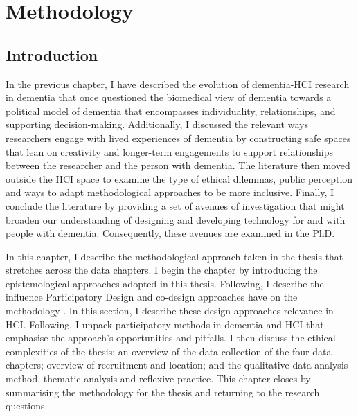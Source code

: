 \chapter{Methodology}
\label{Methodology}

\section{Introduction}
\label{Method:Intro}

In the previous chapter, I have described the evolution of dementia-HCI research in dementia that once questioned the biomedical view of dementia towards a political model of dementia that encompasses individuality, relationships, and supporting decision-making. Additionally, I discussed the relevant ways researchers engage with lived experiences of dementia by constructing safe spaces that lean on creativity and longer-term engagements to support relationships between the researcher and the person with dementia. The literature then moved outside the HCI space to examine the type of ethical dilemmas, public perception and ways to adapt methodological approaches to be more inclusive. Finally, I conclude the literature by providing a set of avenues of investigation that might broaden our understanding of designing and developing technology for and with people with dementia. Consequently, these avenues are examined in the PhD.

In this chapter, I describe the methodological approach taken in the thesis that stretches across the data chapters. I begin the chapter by introducing the epistemological approaches adopted in this thesis. Following, I describe the influence Participatory Design and co-design approaches have on the methodology \citep{duarte2018participatory}. In this section, I describe these design approaches relevance in HCI. Following, I unpack participatory methods in dementia and HCI that emphasise the approach's opportunities and pitfalls. I then discuss the ethical complexities of the thesis; an overview of the data collection of the four data chapters; overview of recruitment and location; and the qualitative data analysis method, thematic analysis and reflexive practice. This chapter closes by summarising the methodology for the thesis and returning to the research questions.  

